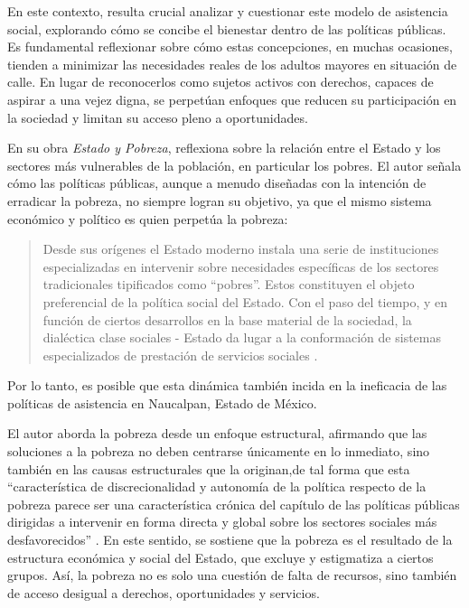 \documentclass[
  spanish,
  11pt,
  a4paper,
]{scrbook}
\begin{document}
En este contexto, resulta crucial analizar y cuestionar este modelo de
asistencia social, explorando cómo se concibe el bienestar dentro de las
políticas públicas. Es fundamental reflexionar sobre cómo estas
concepciones, en muchas ocasiones, tienden a minimizar las necesidades
reales de los adultos mayores en situación de calle. En lugar de
reconocerlos como sujetos activos con derechos, capaces de aspirar a una
vejez digna, se perpetúan enfoques que reducen su participación en la
sociedad y limitan su acceso pleno a oportunidades.

En su obra \emph{Estado y Pobreza}, \textcite{TentiFanfani1989}
reflexiona sobre la relación entre el Estado y los sectores más
vulnerables de la población, en particular los pobres. El autor señala
cómo las políticas públicas, aunque a menudo diseñadas con la intención
de erradicar la pobreza, no siempre logran su objetivo, ya que el mismo
sistema económico y político es quien perpetúa la pobreza:

\begin{quote}
Desde sus orígenes el Estado moderno instala una serie de instituciones
especializadas en intervenir sobre necesidades específicas de los
sectores tradicionales tipificados como ``pobres''. Estos constituyen el
objeto preferencial de la política social del Estado. Con el paso del
tiempo, y en función de ciertos desarrollos en la base material de la
sociedad, la dialéctica clase sociales - Estado da lugar a la
conformación de sistemas especializados de prestación de servicios
sociales \autocite[9]{TentiFanfani1989}.
\end{quote}

Por lo tanto, es posible que esta dinámica también incida en la
ineficacia de las políticas de asistencia en Naucalpan, Estado de
México.

El autor aborda la pobreza desde un enfoque estructural, afirmando que
las soluciones a la pobreza no deben centrarse únicamente en lo
inmediato, sino también en las causas estructurales que la originan,de
tal forma que esta ``característica de discrecionalidad y autonomía de
la política respecto de la pobreza parece ser una característica crónica
del capítulo de las políticas públicas dirigidas a intervenir en forma
directa y global sobre los sectores sociales más desfavorecidos''
\autocite[20]{TentiFanfani1989}. En este sentido, se sostiene que la
pobreza es el resultado de la estructura económica y social del Estado,
que excluye y estigmatiza a ciertos grupos. Así, la pobreza no es solo
una cuestión de falta de recursos, sino también de acceso desigual a
derechos, oportunidades y servicios.
\end{document}
